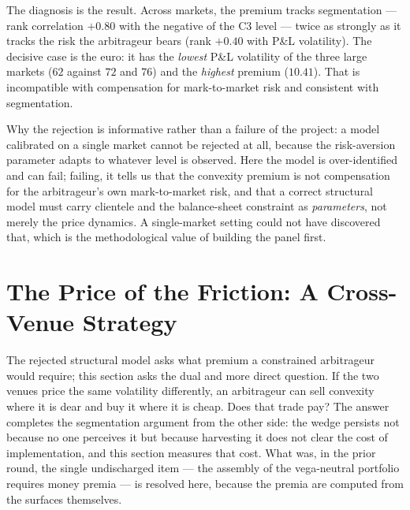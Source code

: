 \documentclass[11pt]{article}
\begin{document}
The diagnosis is the result. Across markets, the premium tracks segmentation --- rank correlation
$+0.80$ with the negative of the C3 level --- twice as strongly as it tracks the risk the arbitrageur
bears (rank $+0.40$ with P\&L volatility). The decisive case is the euro: it has the \emph{lowest}
P\&L volatility of the three large markets ($62$ against $72$ and $76$) and the \emph{highest} premium
($10.41$). That is incompatible with compensation for mark-to-market risk and consistent with
segmentation.

Why the rejection is informative rather than a failure of the project: a model calibrated on a single
market cannot be rejected at all, because the risk-aversion parameter adapts to whatever level is
observed. Here the model is over-identified and can fail; failing, it tells us that the convexity
premium is not compensation for the arbitrageur's own mark-to-market risk, and that a correct
structural model must carry clientele and the balance-sheet constraint as \emph{parameters}, not
merely the price dynamics. A single-market setting could not have discovered that, which is the
methodological value of building the panel first.

\section{The Price of the Friction: A Cross-Venue Strategy}\label{sec:strategy}
The rejected structural model asks what premium a constrained arbitrageur would require; this
section asks the dual and more direct question. If the two venues price the same volatility
differently, an arbitrageur can sell convexity where it is dear and buy it where it is cheap. Does
that trade pay? The answer completes the segmentation argument from the other side: the wedge
persists not because no one perceives it but because harvesting it does not clear the cost of
implementation, and this section measures that cost. What was, in the prior round, the single
undischarged item --- the assembly of the vega-neutral portfolio requires money premia --- is
resolved here, because the premia are computed from the surfaces themselves.
\end{document}
